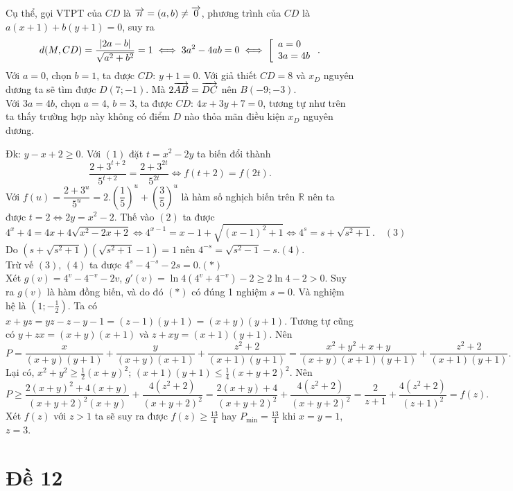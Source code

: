 Cụ thể, gọi VTPT của $CD$ là $\overrightarrow{n}=(a,b)\neq \overrightarrow{0}$, phương trình của $CD$ là $a(x+1)+b(y+1)=0$, suy ra
$$ d(M,CD)=\frac{|2a-b|}{\sqrt{a^2+b^2}}=1\iff  3a^2-4ab=0\iff \left[ \begin{array}{l} a=0\\ 3a=4b \end{array}\right.. $$
Với $a=0$, chọn $b=1$, ta được $CD$: $y+1=0$. Với giả thiết $CD=8$ và $x_D$ nguyên dương ta sẽ tìm được $D(7;-1)$. Mà $2\overrightarrow{AB}=\overrightarrow{DC}$ nên $B(-9;-3)$.\\
Với $3a=4b$, chọn $a=4$, $b=3$, ta được $CD$: $4x+3y+7=0$, tương tự như trên ta thấy trường hợp này không có điểm $D$ nào thỏa mãn điều kiện $x_D$ nguyên dương.

\hda 
Đk: $y-x+2\ge 0$. Với $(1)$ đặt $t=x^2-2y$ ta biến đổi thành
$$ \dfrac{2+3^{t+2}}{5^{t+2}}=\dfrac{2+3^{2t}}{5^{2t}}\iff  f(t+2)=f(2t). $$
Với $f(u)=\dfrac{2+3^u}{5^u}=2.\left(\dfrac 15\right)^u+\left(\dfrac 35\right)^u$ là hàm số nghịch biến trên $\mathbb R$ nên ta được $t=2\iff  2y=x^2-2$. Thế vào $(2)$ ta được
$$ 4^x+4=4x+4\sqrt{x^2-2x+2}\iff  4^{x-1}=x-1+\sqrt{(x-1)^2+1}\iff  4^s=s+\sqrt{s^2+1}.\quad (3) $$
Do $(s+\sqrt{s^2+1})(\sqrt{s^2+1}-1)=1$ nên $4^{-s}=\sqrt{s^2-1}-s$.\quad $(4)$.\\
Trừ vế $(3)$, $(4)$ ta được $4^{s}-4^{-s}-2s=0$.\quad $(\ast)$\\
Xét $g(v)=4^v-4^{-v}-2v$, $g'(v)=\ln 4(4^v+4^{-v})-2\ge 2\ln 4-2>0$. Suy ra $g(v)$ là hàm đồng biến, và do đó $(\ast)$ có đúng 1 nghiệm $s=0$. Và nghiệm hệ là $\left(1;-\frac 12\right)$.
\hda 
Ta có $x+yz=yz-z-y-1=(z-1)(y+1)=(x+y)(y+1)$. Tương tự cũng có
$y+zx=(x+y)(x+1)$ và $z+xy=(x+1)(y+1)$. Nên
$$ P=\frac x{(x+y)(y+1)}+\frac{y}{(x+y)(x+1)}+\frac{z^2+2}{(x+1)(y+1)}=\frac{x^2+y^2+x+y}{(x+y)(x+1)(y+1)}+\frac{z^2+2}{(x+1)(y+1)}. $$
Lại có, $x^2+y^2\ge\frac 12(x+y)^2$; $(x+1)(y+1)\le \frac 14(x+y+2)^2$. Nên
$$ P\ge \frac{2(x+y)^2+4(x+y)}{(x+y+2)^2(x+y)}+\frac{4(z^2+2)}{(x+y+2)^2}=\frac{2(x+y)+4}{(x+y+2)^2}+\frac{4(z^2+2)}{(x+y+2)^2}=\frac{2}{z+1}+\frac{4(z^2+2)}{(z+1)^2}=f(z). $$
Xét $f(z)$ với $z>1$ ta sẽ suy ra được $f(z)\ge \frac{13}4$ hay $P_{\min}=\frac{13}4$ khi $x=y=1$, $z=3$.
\section{Đề 12}

